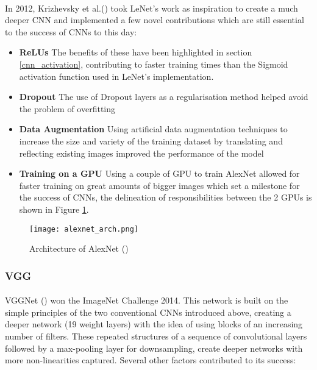 \paragraph{}
In 2012, Krizhevsky et al.(\cite{10.5555/2999134.2999257}) took LeNet's work as inspiration to create a much deeper \gls{CNN} and implemented a few novel contributions which are still essential to the success of \gls{CNN}s to this day:
\begin{itemize}
    \item \textbf{\gls{ReLU}s} The benefits of these have been highlighted in section \ref{cnn_activation}, contributing to faster training times than the Sigmoid activation function used in LeNet's implementation.
    \item \textbf{Dropout} The use of Dropout layers as a regularisation method helped avoid the problem of overfitting
    \item \textbf{Data Augmentation} Using artificial data augmentation techniques to increase the size and variety of the training dataset by translating and reflecting existing images improved the performance of the model
     \item \textbf{Training on a \gls{GPU}} Using a couple of \gls{GPU} to train AlexNet allowed for faster training on great amounts of bigger images which set a milestone for the success of \gls{CNN}s, the delineation of responsibilities between the 2 \gls{GPU}s is shown in Figure \ref{fig_alexnet}.
\end{itemize}

    \begin{figure}[hbt!]
        \centering
        \texttt{[image: alexnet\_arch.png]}
        \caption{Architecture of AlexNet (\cite{10.5555/2999134.2999257})}
        \label{fig_alexnet}
    \end{figure}


\subsubsection{VGG}
\paragraph{}
VGGNet (\cite{simonyan2014deep}) won the ImageNet Challenge 2014. This network is built on the simple principles of the two conventional \gls{CNN}s introduced above, creating a deeper network (19 weight layers) with the idea of using blocks of an increasing number of filters. These repeated structures of a sequence of convolutional layers followed by a max-pooling layer for downsampling, create deeper networks with more non-linearities captured. Several other factors contributed to its success:


